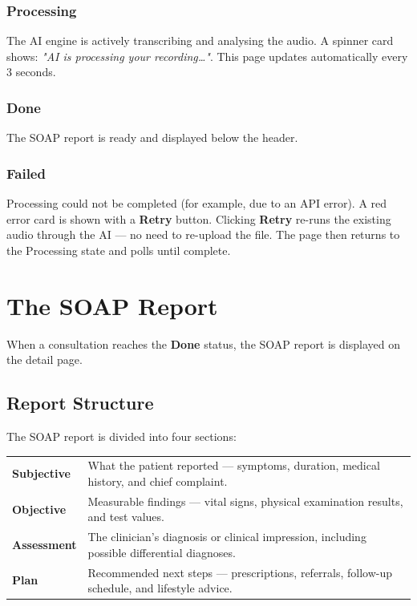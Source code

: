 \documentclass[12pt,a4paper]{article}
\begin{document}
\subsubsection{Processing}
The AI engine is actively transcribing and analysing the audio.
A spinner card shows: \textit{"AI is processing your recording…"}.
This page updates automatically every 3 seconds.

\subsubsection{Done}
The SOAP report is ready and displayed below the header.

\subsubsection{Failed}
Processing could not be completed (for example, due to an API error).
A red error card is shown with a \textbf{Retry} button.
Clicking \textbf{Retry} re-runs the existing audio through the AI — no need to re-upload the file.
The page then returns to the Processing state and polls until complete.

\section{The SOAP Report}

When a consultation reaches the \textbf{Done} status, the SOAP report is displayed on the detail page.

\subsection{Report Structure}
The SOAP report is divided into four sections:

\begin{tabular}{m{3cm}m{9cm}}
	\textbf{Subjective} & What the patient reported — symptoms, duration, medical history, and chief complaint.        \\
	\textbf{Objective}  & Measurable findings — vital signs, physical examination results, and test values.            \\
	\textbf{Assessment} & The clinician's diagnosis or clinical impression, including possible differential diagnoses. \\
	\textbf{Plan}       & Recommended next steps — prescriptions, referrals, follow-up schedule, and lifestyle advice. \\
\end{tabular}
\end{document}
